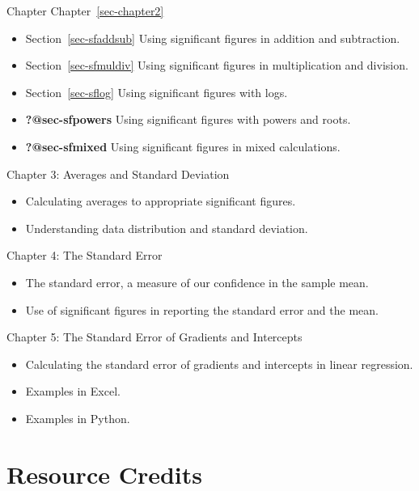\documentclass[
  letterpaper,
  DIV=11,
  numbers=noendperiod]{scrreprt}
\providecommand{\tightlist}{%
  \setlength{\itemsep}{0pt}\setlength{\parskip}{0pt}}
\begin{document}
Chapter Chapter~\ref{sec-chapter2}

\begin{itemize}
\tightlist
\item
  Section~\ref{sec-sfaddsub} Using significant figures in addition and
  subtraction.
\item
  Section~\ref{sec-sfmuldiv} Using significant figures in multiplication
  and division.
\item
  Section~\ref{sec-sflog} Using significant figures with logs.
\item
  \textbf{?@sec-sfpowers} Using significant figures with powers and
  roots.
\item
  \textbf{?@sec-sfmixed} Using significant figures in mixed
  calculations.
\end{itemize}

Chapter 3: Averages and Standard Deviation

\begin{itemize}
\tightlist
\item
  Calculating averages to appropriate significant figures.
\item
  Understanding data distribution and standard deviation.
\end{itemize}

Chapter 4: The Standard Error

\begin{itemize}
\tightlist
\item
  The standard error, a measure of our confidence in the sample mean.
\item
  Use of significant figures in reporting the standard error and the
  mean.
\end{itemize}

Chapter 5: The Standard Error of Gradients and Intercepts

\begin{itemize}
\tightlist
\item
  Calculating the standard error of gradients and intercepts in linear
  regression.
\item
  Examples in Excel.
\item
  Examples in Python.
\end{itemize}

\section*{Resource Credits}\label{resource-credits}
\end{document}
